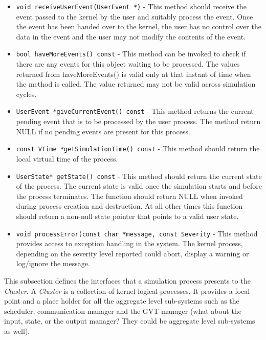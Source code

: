 \begin{itemize}

\item{\tt void receiveUserEvent(UserEvent *)} - This method should receive
  the event passed to the kernel by the user and suitably process the
  event. Once the event has been handed over to the kernel, the user has
  no control over the data in the event and the user may not modify the
  contents of the event.

\item{\tt bool haveMoreEvents() const} - This method can be invoked to check
  if there are any events for this object waiting to be processed.  The
  values returned from haveMoreEvents() is valid only at that instant of
  time when the method is called. The value returned may not be valid
  across simulation cycles.
    
\item{\tt UserEvent *giveCurrentEvent() const} - This method returns the
  current pending event that is to be processed by the user process. The
  method return NULL if no pending events are present for this process.
  
\item{\tt const VTime *getSimulationTime() const} - This method should
  return the local virtual time of the process.
  
\item{\tt UserState* getState() const} - This method should return the
  current state of the process. The current state is valid once the
  simulation starts and before the process terminates. The function should
  return NULL when invoked during process creation and destruction. At all
  other times this function should return a non-null state pointer that
  points to a valid user state.

\item{\tt void processError(const char *message, const Severity} - This
  method provides access to exception handling in the system. The kernel
  process, depending on the severity level reported could abort, display a
  warning or log/ignore the message.

\end{itemize}

This subsection defines the interfaces that a simulation process presents
to the \emph{Cluster}.  A \emph{Cluster} is a collection of kernel logical
processes.  It provides a focal point and a place holder for all the
aggregate level sub-systems such as the scheduler, communication manager
and the GVT manager (what about the input, state, or the output
manager? They could be aggregate level sub-systems as well). 

